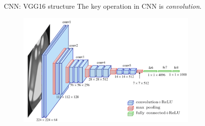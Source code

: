 \documentclass[xcolor={dvipsnames,svgnames}]{beamer}
\begin{document}
\begin{frame}{CNN: VGG16 structure}
The key operation in CNN is \textit{convolution}. 
     \begin{figure}[H]
        \centering
            \includegraphics[width=0.8\textwidth]{presentation/figures-models/vgg16-model.png}
        \end{figure} 
\end{frame}
\end{document}
